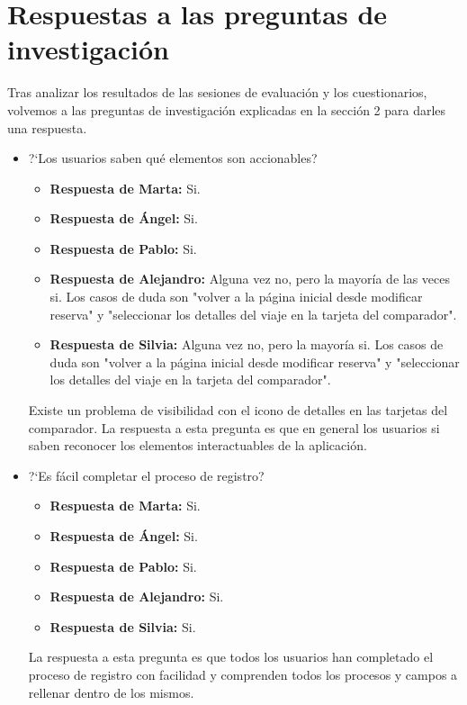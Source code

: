 \section{Respuestas a las preguntas de investigación}

Tras analizar los resultados de las sesiones de evaluación y los cuestionarios, volvemos a las preguntas de investigación explicadas en la sección 2 para darles una respuesta.

\begin{itemize}
    \item ?`Los usuarios saben qué elementos son accionables?
          \begin{itemize}
              \item\textbf{Respuesta de Marta:} Si.
              \item \textbf{Respuesta de Ángel:} Si.
              \item\textbf{Respuesta de Pablo:} Si.
              \item\textbf{Respuesta de Alejandro:} Alguna vez no, pero la mayoría de las veces si. Los casos de duda son "volver a la página inicial desde modificar reserva" y "seleccionar los detalles del viaje en la tarjeta del comparador".
              \item\textbf{Respuesta de Silvia:} Alguna vez no, pero la mayoría si. Los casos de duda son "volver a la página inicial desde modificar reserva" y "seleccionar los detalles del viaje en la tarjeta del comparador".
          \end{itemize}
          Existe un problema de visibilidad con el icono de detalles en las tarjetas del comparador. La respuesta a esta pregunta es que en general los usuarios si saben reconocer los elementos interactuables de la aplicación.
    \item ?`Es fácil completar el proceso de registro?
          \begin{itemize}
              \item\textbf{Respuesta de Marta:} Si.
              \item \textbf{Respuesta de Ángel:} Si.
              \item\textbf{Respuesta de Pablo:} Si.
              \item\textbf{Respuesta de Alejandro:} Si.
              \item\textbf{Respuesta de Silvia:} Si.
          \end{itemize}
          La respuesta a esta pregunta es que todos los usuarios han completado el proceso de registro con facilidad y comprenden todos los procesos y campos a rellenar dentro de los mismos.

\end{itemize}
